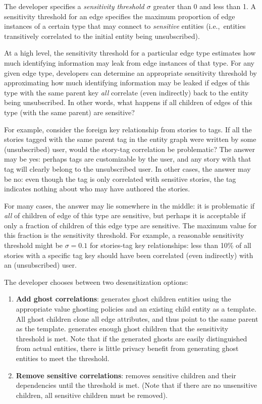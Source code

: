The developer specifies a \emph{sensitivity threshold $\sigma$} greater than 0 and less than 1.  A
sensitivity threshold for an edge specifies the maximum proportion of edge instances of a certain
type that may connect to \emph{sensitive} entities (i.e.,\ entities transitively correlated to the
initial entity being unsubscribed). 

At a high level, the sensitivity threshold for a particular edge type estimates how much identifying
information may leak from edge instances of that type.  For any given edge type, developers can
determine an appropriate sensitivity threshold by approximating how much identifying information may
be leaked if edges of this type with the same parent key \emph{all} correlate (even indirectly) back
to the entity being unsubscribed. In other words, what happens if all children of edges of this type
(with the same parent) are sensitive?

For example, consider the foreign key relationship from stories to tags. If all the stories tagged
with the same parent tag in the entity graph were written by some (unsubscribed) user, would the
story-tag correlation be problematic? The answer may be yes: perhaps tags are customizable by the
user, and any story with that tag will clearly belong to the unsubscribed user. In other cases, the
answer may be no: even though the tag is only correlated with sensitive stories, the tag indicates
nothing about who may have authored the stories.

For many cases, the answer may lie somewhere in the middle: it is problematic if \emph{all} of
children of edge of this type are sensitive, but perhaps it is acceptable if only a fraction of
children of this edge type are sensitive. The maximum value for this fraction is the sensitivity
threshold.  For example, a reasonable sensitivity threshold might be $\sigma = 0.1$ for stories-tag
key relationships: less than 10\% of all stories with a specific tag key should have been correlated
(even indirectly) with an (unsubscribed) user. 

The developer chooses between two desensitization options:
\begin{enumerate}
    \item \textbf{Add ghost correlations}: \sys generates ghost children entities using the
        appropriate value ghosting policies and an existing child entity as a template. All ghost
        children clone all edge attributes, and thus point to the same parent as the template. \sys
        generates enough ghost children that the sensitivity threshold is met.  Note that if the
        generated ghosts are easily distinguished from actual entities, there is little privacy
        benefit from generating ghost entities to meet the threshold.

\item \textbf{Remove sensitive correlations}: \sys removes sensitive children and their dependencies
    until the threshold is met. (Note that if there are no unsensitive children, all sensitive
        children must be removed).
\end{enumerate}


